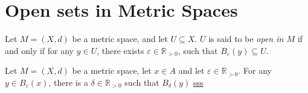 \section{Open sets in Metric Spaces}


\begin{definition}
	Let $M = (X, d)$ be a metric space, and let $U \subseteq X$. $U$ is said to be \textit{open in $M$} if and only if for any $y \in U$, there exists $\varepsilon \in \mathbb R_{> 0}$, such that $B_\varepsilon(y) \subseteq U$.
\end{definition}




\begin{lemma}
	Let $M = (X, d)$ be a metric space, let $x \in A$ and let $\varepsilon \in \mathbb R_{> 0}$. For any $y \in B_\varepsilon (x)$, there is a $\delta \in \mathbb R_{> 0}$ such that $B_\delta (y)$
	\href{definition: metric space}{sss}
\end{lemma}












































%